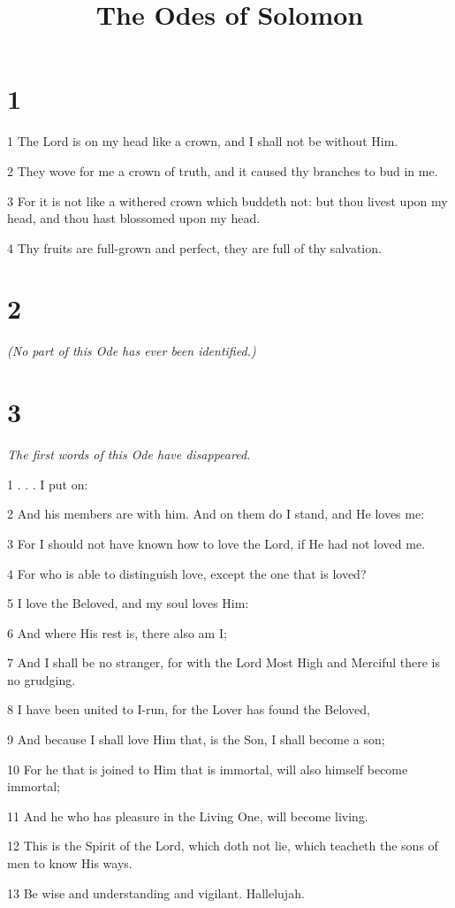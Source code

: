 

\title{The Odes of Solomon}

\chapter{1}

\par 1 The Lord is on my head like a crown, and I shall not be without Him.
\par 2 They wove for me a crown of truth, and it caused thy branches to bud in me.
\par 3 For it is not like a withered crown which buddeth not: but thou livest upon my head, and thou hast blossomed upon my head.
\par 4 Thy fruits are full-grown and perfect, they are full of thy salvation.



\chapter{2}

\par \textit{(No part of this Ode has ever been identified.)}

\chapter{3}

\par \textit{The first words of this Ode have disappeared.}

\par 1 .    .    .   I put on:
\par 2 And his members are with him. And on them do I stand, and He loves me:
\par 3 For I should not have known how to love the Lord, if He had not loved me.
\par 4 For who is able to distinguish love, except the one that is loved?
\par 5 I love the Beloved, and my soul loves Him:
\par 6 And where His rest is, there also am I;
\par 7 And I shall be no stranger, for with the Lord Most High and Merciful there is no grudging.
\par 8 I have been united to I-run, for the Lover has found the Beloved,
\par 9 And because I shall love Him that, is the Son, I shall become a son;
\par 10 For he that is joined to Him that is immortal, will also himself become immortal;
\par 11 And he who has pleasure in the Living One, will become living.
\par 12 This is the Spirit of the Lord, which doth not lie, which teacheth the sons of men to know His ways.
\par 13 Be wise and understanding and vigilant. Hallelujah.

